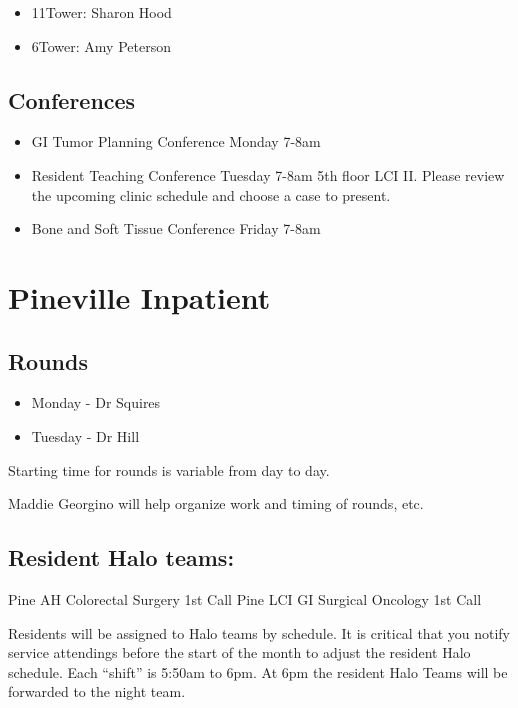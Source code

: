 \documentclass[
]{book}
\providecommand{\tightlist}{%
  \setlength{\itemsep}{0pt}\setlength{\parskip}{0pt}}
\begin{document}
\begin{itemize}
\tightlist
\item
  11Tower: Sharon Hood
\item
  6Tower: Amy Peterson
\end{itemize}

\hypertarget{conferences}{%
\section{Conferences}\label{conferences}}

\begin{itemize}
\tightlist
\item
  GI Tumor Planning Conference Monday 7-8am
\item
  Resident Teaching Conference Tuesday 7-8am 5th floor LCI II. Please review the upcoming clinic schedule and choose a case to present.
\item
  Bone and Soft Tissue Conference Friday 7-8am
\end{itemize}

\hypertarget{pineville-inpatient}{%
\chapter{Pineville Inpatient}\label{pineville-inpatient}}

\hypertarget{rounds-1}{%
\section{Rounds}\label{rounds-1}}

\begin{itemize}
\tightlist
\item
  Monday - Dr Squires
\item
  Tuesday - Dr Hill
\end{itemize}

Starting time for rounds is variable from day to day.

Maddie Georgino will help organize work and timing of rounds, etc.

\hypertarget{resident-halo-teams}{%
\section{Resident Halo teams:}\label{resident-halo-teams}}

Pine AH Colorectal Surgery 1st Call
Pine LCI GI Surgical Oncology 1st Call

Residents will be assigned to Halo teams by schedule. It is critical that you notify service attendings before the start of the month to adjust the resident Halo schedule. Each ``shift'' is 5:50am to 6pm. At 6pm the resident Halo Teams will be forwarded to the night team.
\end{document}
